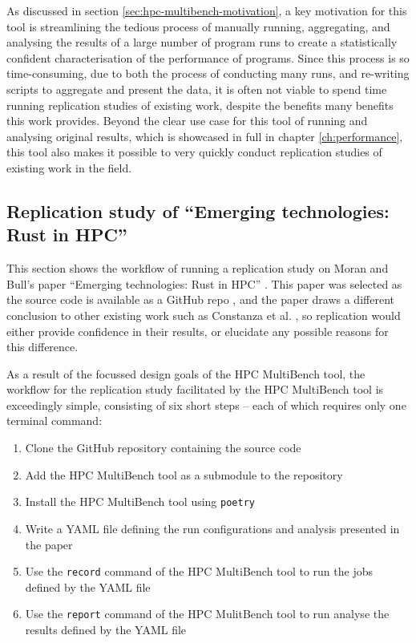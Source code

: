 As discussed in section \ref{sec:hpc-multibench-motivation}, a key motivation for this tool is streamlining the tedious process of manually running, aggregating, and analysing the results of a large number of program runs to create a statistically confident characterisation of the performance of programs. Since this process is so time-consuming, due to both the process of conducting many runs, and re-writing scripts to aggregate and present the data, it is often not viable to spend time running replication studies of existing work, despite the benefits many benefits this work provides. Beyond the clear use case for this tool of running and analysing original results, which is showcased in full in chapter \ref{ch:performance}, this tool also makes it possible to very quickly conduct replication studies of existing work in the field.

\subsection{Replication study of ``Emerging technologies: Rust in HPC''}
\label{ssec:hpc-multibench-replication-study}

This section shows the workflow of running a replication study on Moran and Bull's paper ``Emerging technologies: Rust in HPC'' \cite{moranEmergingTechnologiesRust2023}. This paper was selected as the source code is available as a GitHub repo \cite{}, and the paper draws a different conclusion to other existing work such as Constanza et al. \cite{costanzoPerformanceVsProgramming2021}, so replication would either provide confidence in their results, or elucidate any possible reasons for this difference.

As a result of the focussed design goals of the HPC MultiBench tool, the workflow for the replication study facilitated by the HPC MultiBench tool is exceedingly simple, consisting of six short steps -- each of which requires only one terminal command:

\begin{enumerate}
    \item Clone the GitHub repository containing the source code
    \item Add the HPC MultiBench tool as a submodule to the repository
    \item Install the HPC MultiBench tool using \texttt{poetry}
    \item Write a YAML file defining the run configurations and analysis presented in the paper
    \item Use the \texttt{record} command of the HPC MultiBench tool to run the jobs defined by the YAML file
    \item Use the \texttt{report} command of the HPC MulitBench tool to run analyse the results defined by the YAML file
\end{enumerate}

